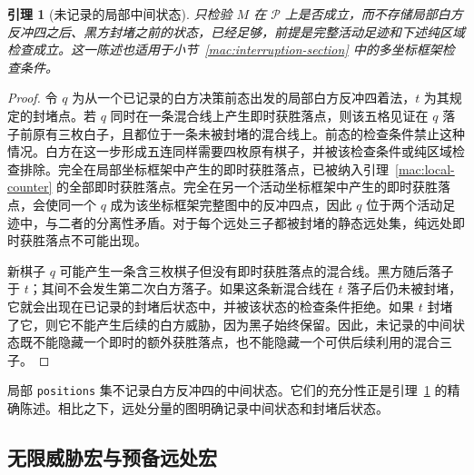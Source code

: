 \documentclass[11pt]{article}
\newtheorem{lemma}[theorem]{引理}
\theoremstyle{definition}
\theoremstyle{remark}
\begin{document}
\begin{lemma}[未记录的局部中间状态]\label{mac:intermediate}
只检验 \(M\) 在 \(\mathcal P\) 上是否成立，而不存储局部白方反冲四之后、黑方封堵之前的状态，已经足够，前提是完整活动足迹和下述纯区域检查成立。这一陈述也适用于小节~\ref{mac:interruption-section} 中的多坐标框架检查条件。

\end{lemma}
\begin{proof}
令 \(q\) 为从一个已记录的白方决策前态出发的局部白方反冲四着法，\(t\) 为其规定的封堵点。若 \(q\) 同时在一条混合线上产生即时获胜落点，则该五格见证在 \(q\) 落子前原有三枚白子，且都位于一条未被封堵的混合线上。前态的检查条件禁止这种情况。白方在这一步形成五连同样需要四枚原有棋子，并被该检查条件或纯区域检查排除。完全在局部坐标框架中产生的即时获胜落点，已被纳入引理~\ref{mac:local-counter} 的全部即时获胜落点。完全在另一个活动坐标框架中产生的即时获胜落点，会使同一个 \(q\) 成为该坐标框架完整图中的反冲四点，因此 \(q\) 位于两个活动足迹中，与二者的分离性矛盾。对于每个远处三子都被封堵的静态远处集，纯远处即时获胜落点不可能出现。

新棋子 \(q\) 可能产生一条含三枚棋子但没有即时获胜落点的混合线。黑方随后落子于 \(t\)；其间不会发生第二次白方落子。如果这条新混合线在 \(t\) 落子后仍未被封堵，它就会出现在已记录的封堵后状态中，并被该状态的检查条件拒绝。如果 \(t\) 封堵了它，则它不能产生后续的白方威胁，因为黑子始终保留。因此，未记录的中间状态既不能隐藏一个即时的额外获胜落点，也不能隐藏一个可供后续利用的混合三子。
\end{proof}

局部 \texttt{positions} 集不记录白方反冲四的中间状态。它们的充分性正是引理~\ref{mac:intermediate} 的精确陈述。相比之下，远处分量的图明确记录中间状态和封堵后状态。

\subsection{无限威胁宏与预备远处宏}\label{mac:static-section}
\end{document}
